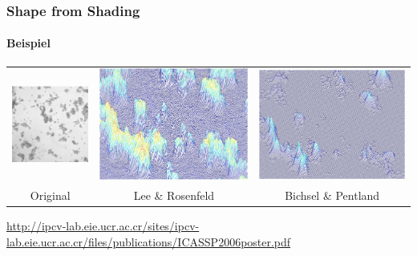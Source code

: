 \documentclass{beamer}
\begin{document}

\begin{frame}
	\frametitle{Shape from Shading}
	\framesubtitle{Beispiel}
	
	\begin{tabular}{ccc}
		\includegraphics[width=0.3\linewidth]{includes/bhk_original} &
		\includegraphics[width=0.3\linewidth]{includes/bhk_lee_rosenfeld} &
		\includegraphics[width=0.3\linewidth]{includes/bhk_binsel_pentland} \\
		Original &
		Lee \& Rosenfeld &
		Bichsel \& Pentland
	\end{tabular}
	
	\vspace{3em}
	\tiny
	\href{http://ipcv-lab.eie.ucr.ac.cr/sites/ipcv-lab.eie.ucr.ac.cr/files/publications/ICASSP2006poster.pdf}{http://ipcv-lab.eie.ucr.ac.cr/sites/ipcv-lab.eie.ucr.ac.cr/files/publications/ICASSP2006poster.pdf}
\end{frame}
\end{document}

